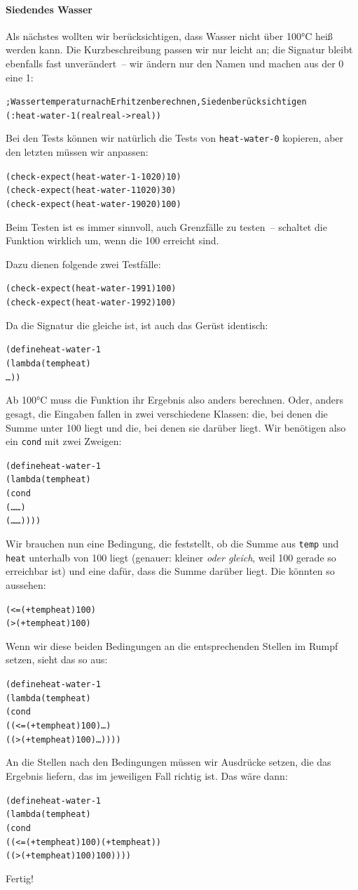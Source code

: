 \paragraph{Siedendes Wasser} Als nächstes wollten wir berücksichtigen,
dass Wasser nicht über 100°C heiß werden kann.  Die Kurzbeschreibung
passen wir nur leicht an; die Signatur bleibt ebenfalls fast
unverändert~-- wir ändern nur den Namen und machen aus der 0 eine 1:
%
\begin{alltt}
; Wassertemperatur nach Erhitzen berechnen, Sieden berücksichtigen
(: heat-water-1 (real real -> real))
\end{alltt}
%
Bei den Tests können wir natürlich die Tests von \texttt{heat-water-0}
kopieren, aber den letzten müssen wir anpassen:
%
\begin{alltt}
(check-expect (heat-water-1 -10 20) 10)
(check-expect (heat-water-1 10 20) 30)
(check-expect (heat-water-1 90 20) 100)
\end{alltt}
%
Beim Testen ist es immer sinnvoll, auch Grenzfälle zu testen~--
schaltet die Funktion wirklich um, wenn die 100 erreicht sind. %
                              
Dazu dienen folgende zwei Testfälle:
%
\begin{alltt}
(check-expect (heat-water-1 99 1) 100)
(check-expect (heat-water-1 99 2) 100)
\end{alltt}
%
Da die Signatur die gleiche ist, ist auch das Gerüst identisch:
%
\begin{alltt}
(define heat-water-1
  (lambda (temp heat)
    \ldots))
\end{alltt}
%
Ab 100°C muss die Funktion ihr Ergebnis also anders berechnen.  Oder,
anders gesagt, die Eingaben fallen in zwei verschiedene Klassen: die,
bei denen die Summe unter 100 liegt und die, bei denen sie darüber
liegt.
Wir benötigen also ein \texttt{cond} mit zwei
Zweigen:
%
\begin{alltt}
(define heat-water-1
  (lambda (temp heat)
    (cond
      (\ldots \ldots)
      (\ldots \ldots))))
\end{alltt}
%
Wir brauchen nun eine Bedingung, die feststellt, ob die Summe aus
\texttt{temp} und \texttt{heat} unterhalb von 100 liegt (genauer:
kleiner \emph{oder gleich}, weil 100 gerade so erreichbar ist) und
eine dafür, dass die Summe darüber liegt.  Die könnten so aussehen:
%
\begin{alltt}
(<= (+ temp heat) 100)
(> (+ temp heat) 100)
\end{alltt}
%
Wenn wir diese beiden Bedingungen an die entsprechenden Stellen im
Rumpf setzen, sieht das so aus:
%
\begin{alltt}
(define heat-water-1
  (lambda (temp heat)
    (cond
      ((<= (+ temp heat) 100) \ldots)
      ((> (+ temp heat) 100) \ldots))))
\end{alltt}
%
An die Stellen nach den Bedingungen müssen wir Ausdrücke setzen, die
das Ergebnis liefern, das im jeweiligen Fall richtig ist.  Das wäre dann:
%
\begin{alltt}
(define heat-water-1
  (lambda (temp heat)
    (cond
      ((<= (+ temp heat) 100) (+ temp heat))
      ((> (+ temp heat) 100) 100))))
\end{alltt}
%
Fertig!
%
%

